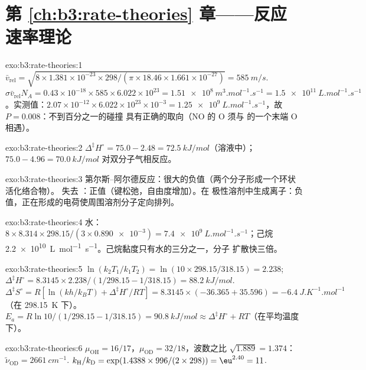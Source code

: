 \section*{第 \ref{ch:b3:rate-theories} 章——反应速率理论}

\begin{solution}{exo:b3:rate-theories:1}
$\bar v_{\mathrm{rel}} = \sqrt{8 \times 1.381\times10^{-23} \times 298/(\pi \times 18.46 \times 1.661\times10^{-27})} = \qty{585}{m/s}$.
$\sigma\bar v_{\mathrm{rel}}N_A = 0.43\times10^{-18} \times 585 \times 6.022\times10^{23} = \qty{1.51e8}{m^3.mol^{-1}.s^{-1}} =
\qty{1.5e11}{L.mol^{-1}.s^{-1}}$。实测值：$2.07\times10^{-12} \times 6.022\times10^{23}\times10^{-3} =
\qty{1.25e9}{L.mol^{-1}.s^{-1}}$，故 $P = 0.008$：不到百分之一的碰撞
具有正确的取向（NO 的 O 须与  的一个末端 O 相遇）。
\end{solution}

\begin{solution}{exo:b3:rate-theories:2}
$\Delta^{\ddagger}H^\circ = 75.0 - 2.48 = \qty{72.5}{kJ/mol}$（溶液中）；$75.0 - 4.96 = \qty{70.0}{kJ/mol}$
对双分子气相反应。
\end{solution}

\begin{solution}{exo:b3:rate-theories:3}
第尔斯–阿尔德反应：很大的负值（两个分子形成一个环状活化络合物）。
失去 ：正值（键松弛，自由度增加）。在
极性溶剂中生成离子：负值，正在形成的电荷使周围溶剂分子定向排列。
\end{solution}

\begin{solution}{exo:b3:rate-theories:4}
水：$8 \times 8.314 \times 298.15/(3 \times \num{0.890e-3}) = \qty{7.4e9}{L.mol^{-1}.s^{-1}}$；己烷
\qty{2.2e10}{L.mol^{-1}.s^{-1}}。己烷黏度只有水的三分之一，分子
扩散快三倍。
\end{solution}

\begin{solution}{exo:b3:rate-theories:5}
$\ln(k_2T_1/k_1T_2) = \ln(10 \times 298.15/318.15) = 2.238$; $\Delta^{\ddagger}H^\circ = 8.3145 \times 2.238/(1/298.15 -
1/318.15) = \qty{88.2}{kJ/mol}$. $\Delta^{\ddagger}S^\circ = R[\ln(kh/k_BT) + \Delta^{\ddagger}H^\circ/RT] = 8.3145 \times
(-36.365 + 35.596) = \qty{-6.4}{J.K^{-1}.mol^{-1}}$（在 \qty{298.15}{K} 下）。$E_a = R\ln10/(1/298.15 - 1/318.15) =
\qty{90.8}{kJ/mol} \approx \Delta^{\ddagger}H^\circ + RT$（在平均温度下）。
\end{solution}

\begin{solution}{exo:b3:rate-theories:6}
$\mu_{\mathrm{OH}} = 16/17$，$\mu_{\mathrm{OD}} = 32/18$，波数之比 $\sqrt{1.889} = 1.374$：
$\tilde\nu_{\mathrm{OD}} = \qty{2661}{cm^{-1}}$. $k_{\mathrm H}/k_{\mathrm D} = \exp(1.4388 \times 996/(2 \times 298)) = \eu^{2.40} = 11$.
\end{solution}

